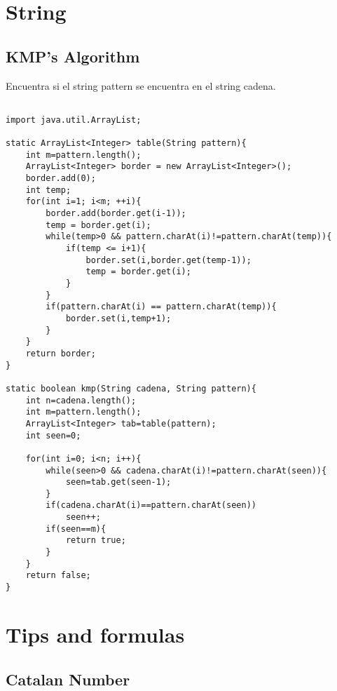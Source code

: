 \documentclass[11pt,letterpaper,twocolumn,twosided]{article}
\begin{document}
\section{String}

\subsection{KMP's Algorithm}

Encuentra si el string pattern se encuentra en el string cadena.
\begin{lstlisting}

import java.util.ArrayList;

static ArrayList<Integer> table(String pattern){
	int m=pattern.length();
	ArrayList<Integer> border = new ArrayList<Integer>();
	border.add(0);
	int temp;
	for(int i=1; i<m; ++i){
		border.add(border.get(i-1));
		temp = border.get(i);
		while(temp>0 && pattern.charAt(i)!=pattern.charAt(temp)){
			if(temp <= i+1){
				border.set(i,border.get(temp-1));
				temp = border.get(i);
			}
		}
		if(pattern.charAt(i) == pattern.charAt(temp)){
			border.set(i,temp+1);
		}
	}
	return border;
}

static boolean kmp(String cadena, String pattern){
	int n=cadena.length();
	int m=pattern.length();
	ArrayList<Integer> tab=table(pattern);
	int seen=0;

	for(int i=0; i<n; i++){
		while(seen>0 && cadena.charAt(i)!=pattern.charAt(seen)){
			seen=tab.get(seen-1);
		}
		if(cadena.charAt(i)==pattern.charAt(seen))
			seen++;
		if(seen==m){
			return true;
		}
	}
	return false;
}
\end{lstlisting}

\section{Tips and formulas}

\subsection{Catalan Number}
\end{document}
